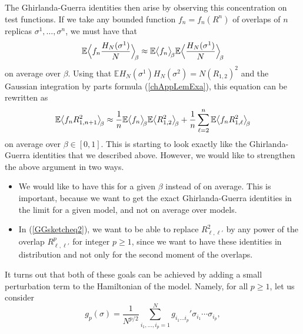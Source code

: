 \documentclass[12pt]{article}
\newcommand{\e}{\mathbb{E}}
\newcommand{\la}{\langle}
\newcommand{\ra}{\rangle}
\theoremstyle{nonumberplain}
\begin{document}
The Ghirlanda-Guerra identities then arise by observing this concentration on test functions. If we take any bounded function $f_n=f_n(R^n)$ of overlaps of $n$ replicas $\sigma^1,\ldots,\sigma^n$, we must have that
\begin{equation}
\e \Bigl\la f_n \frac{H_N(\sigma^1)}{N} \Bigr\ra_{\hspace{-0.5mm}\beta}
\approx
\e \bigl\la f_n \bigr\ra_{\hspace{-0.5mm}\beta}
\e \Bigl\la \frac{H_N(\sigma^1)}{N} \Bigr\ra_{\hspace{-0.5mm}\beta}
\label{GGsketcheq1}
\end{equation}
 on average over $\beta$. Using that $\e H_N(\sigma^1)H_N(\sigma^2) = N (R_{1,2})^2$ and the Gaussian integration by parts formula (\ref{chAppLemExa}), this equation can be rewritten as
\begin{equation}
\e \bigl\la f_n R_{1,n+1}^2 \bigr\ra_{\hspace{-0.5mm}\beta}
\approx
\frac{1}{n} \e \bigl\la f_n  \bigr\ra_{\hspace{-0.5mm}\beta}\e \bigl\la R_{1,2}^2 \bigr\ra_{\hspace{-0.5mm}\beta}
+\frac{1}{n} \sum_{\ell=2}^n \e \bigl\la f_n R_{1,\ell}^2 \bigr\ra_{\hspace{-0.5mm}\beta}
\label{GGsketcheq2}
\end{equation}
on average over $\beta\in [0,1]$. This is starting to look exactly like the Ghirlanda-Guerra identities that we described above. However, we would like to strengthen the above argument in two ways.
\begin{itemize}
\item[(i)] We would like to have this for a given $\beta$ instead of on average. This is important, because we want to get the exact Ghirlanda-Guerra identities in the limit for a given model, and not on average over models.

\item[(ii)] In (\ref{GGsketcheq2}), we want to be able to replace $R_{\ell,\ell'}^2$ by any power of the overlap $R_{\ell,\ell'}^p$ for integer $p\geq 1$, since we want to have these identities in distribution and not only for the second moment of the overlaps.
\end{itemize}
It turns out that both of these goals can be achieved by adding a small perturbation term to the Hamiltonian of the model. Namely, for all $p\geq 1$, let us consider
\begin{equation}
g_{p}(\sigma)
=
\frac{1}{N^{p/2}}
\sum_{i_1,\ldots,i_p = 1}^N g_{i_1\ldots i_p}' \sigma_{i_1}\cdots\sigma_{i_p},
\label{ch31mixedppert}
\end{equation}
\end{document}

